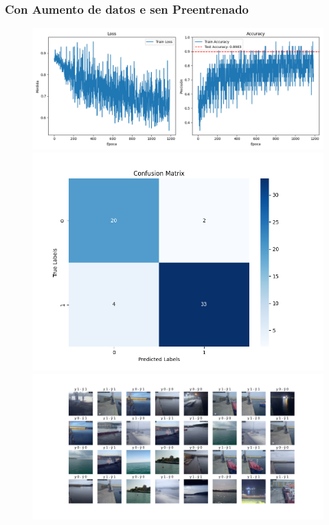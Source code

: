 \documentclass{article}
\begin{document}
\begin{figure}[H]
\begin{minipage}{0.7\textwidth}
    \end{minipage}
\end{figure}
\subsubsection{Con Aumento de datos e sen Preentrenado}
\begin{figure}[H]
    \centering
    \begin{minipage}{0.55\textwidth}
        \centering
        \includegraphics[width=\linewidth]{../figures/LOSS__A_True_P_False_D_False_MLP_True_efficientnet_b4.png}
    \end{minipage}
    \begin{minipage}{0.3\textwidth}
        \centering
        \includegraphics[width=\linewidth]{../figures/CM__A_True_P_False_D_False_MLP_True_efficientnet_b4.png}
    \end{minipage}
    \begin{minipage}{0.7\textwidth}
        \centering
        \includegraphics[width=\linewidth]{../figures/GRID__A_True_P_False_D_False_MLP_True_efficientnet_b4.png}

\end{minipage}
\end{figure}
\end{document}
